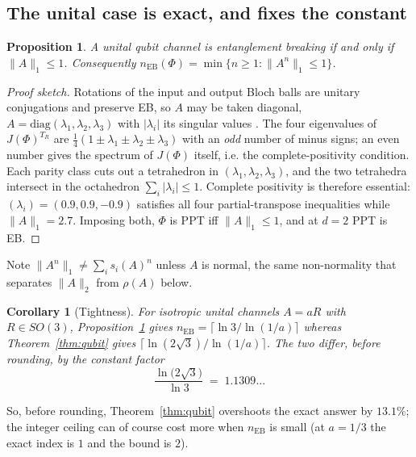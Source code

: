 \documentclass[11pt,a4paper]{article}
\newtheorem{proposition}[theorem]{Proposition}
\newtheorem{corollary}[theorem]{Corollary}
\theoremstyle{definition}
\theoremstyle{remark}
\begin{document}
\subsection{The unital case is exact, and fixes the constant}

\begin{proposition}\label{prop:unital}
A unital qubit channel is entanglement breaking if and only if
$\|A\|_1\le1$. Consequently
$n_{\mathrm{EB}}(\Phi)=\min\{n\ge1:\|A^{n}\|_1\le1\}$.
\end{proposition}

\begin{proof}[Proof sketch]
Rotations of the input and output Bloch balls are unitary conjugations and
preserve EB, so $A$ may be taken diagonal, $A=\mathrm{diag}(\lambda_1,\lambda_2,\lambda_3)$
with $|\lambda_i|$ its singular values \cite{RSW02}. The four eigenvalues of
$J(\Phi)^{T_R}$ are $\tfrac14(1\pm\lambda_1\pm\lambda_2\pm\lambda_3)$ with an
\emph{odd} number of minus signs; an even number gives the spectrum of
$J(\Phi)$ itself, i.e. the complete-positivity condition. Each parity class
cuts out a tetrahedron in $(\lambda_1,\lambda_2,\lambda_3)$, and the two
tetrahedra intersect in the octahedron $\sum_i|\lambda_i|\le1$. Complete
positivity is therefore essential: $(\lambda_i)=(0.9,0.9,-0.9)$ satisfies all
four partial-transpose inequalities while $\|A\|_1=2.7$. Imposing both,
$\Phi$ is PPT iff $\|A\|_1\le1$, and at $d=2$ PPT is EB.
\end{proof}

Note $\|A^n\|_1\ne\sum_i s_i(A)^n$ unless $A$ is normal, the same
non-normality that separates $\|A\|_2$ from $\rho(A)$ below.

\begin{corollary}[Tightness]\label{cor:tight}
For isotropic unital channels $A=aR$ with $R\in SO(3)$,
Proposition~\ref{prop:unital} gives $n_{\mathrm{EB}}=\lceil\ln3/\ln(1/a)\rceil$
whereas Theorem~\ref{thm:qubit} gives $\lceil\ln(2\sqrt3)/\ln(1/a)\rceil$. The
two differ, before rounding, by the constant factor
\begin{equation}\label{eq:tightconst}
  \frac{\ln\bigl(2\sqrt3\bigr)}{\ln 3}\;=\;1.1309\ldots
\end{equation}
\end{corollary}

So, before rounding, Theorem~\ref{thm:qubit} overshoots the exact answer by
$13.1\%$; the integer ceiling can of course cost more when $n_{\mathrm{EB}}$
is small (at $a=1/3$ the exact index is $1$ and the bound is $2$).
\end{document}
